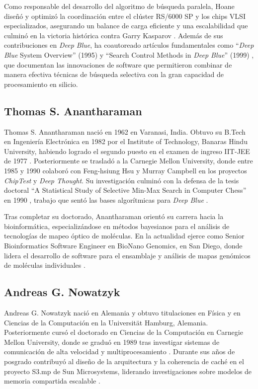 \documentclass[a4paper, 12pt]{article}
\begin{document}
Como responsable del desarrollo del algoritmo de búsqueda 
paralela, Hoane diseñó y optimizó la coordinación entre el clúster 
RS/6000 SP y los chips VLSI especializados, asegurando un balance 
de carga eficiente y una escalabilidad que culminó en la victoria 
histórica contra Garry Kasparov \cite{ibmHistoryDeepBlue}. 
Además de sus contribuciones en \emph{Deep Blue}, ha coautoreado artículos 
fundamentales como “\emph{Deep Blue} System Overview” (1995) \cite{hsu1995deep} y 
“Search Control Methods in \emph{Deep Blue}” (1999) \cite{campbell1999search}, 
que documentan las 
innovaciones de software que permitieron combinar de manera 
efectiva técnicas de búsqueda selectiva con la gran capacidad de 
procesamiento en silicio.

\subsection*{Thomas S. Anantharaman}

Thomas S. Anantharaman nació en 1962 en Varanasi, India. 
Obtuvo su B.Tech en Ingeniería Electrónica en 1982 por el 
Institute of Technology, Banaras Hindu University, habiendo 
logrado el segundo puesto en el examen de ingreso IIT-JEE de 1977 
\cite{itbhu_anantharaman}. Posteriormente se trasladó a la 
Carnegie Mellon University, donde entre 1985 y 1990 colaboró con 
Feng-hsiung Hsu y Murray Campbell en los proyectos \emph{ChipTest} y 
\emph{Deep Thought}. Su investigación culminó con la defensa de la tesis 
doctoral “A Statistical Study of Selective Min-Max Search in 
Computer Chess” en 1990 \cite{anantharaman1990statistical}, trabajo que sentó las bases algorítmicas 
para \emph{Deep Blue} \cite{chessprog_anantharaman}.

Tras completar su doctorado, Anantharaman orientó su carrera hacia 
la bioinformática, especializándose en métodos bayesianos para el 
análisis de tecnologías de mapeo óptico de moléculas. En la 
actualidad ejerce como Senior Bioinformatics Software Engineer en 
BioNano Genomics, en San Diego, donde lidera el desarrollo de 
software para el ensamblaje y análisis de mapas genómicos de 
moléculas individuales \cite{linkedin_anantharaman}.  

\subsection*{Andreas G. Nowatzyk}

Andreas G. Nowatzyk nació en Alemania y obtuvo titulaciones en 
Física y en Ciencias de la Computación en la Universität Hamburg, 
Alemania. Posteriormente cursó el doctorado en Ciencias de la 
Computación en Carnegie Mellon University, donde se graduó en 1989 
tras investigar sistemas de comunicación de alta velocidad y 
multiprocesamiento \cite{cmuNowatzyk}. Durante sus años de 
posgrado contribuyó al diseño de la arquitectura y la coherencia 
de caché en el proyecto S3.mp de Sun Microsystems, liderando 
investigaciones sobre modelos de memoria compartida escalable 
\cite{s3mpNowatzyk}.
\end{document}

